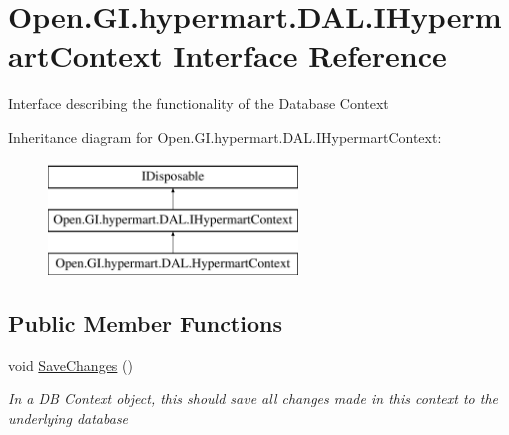 \hypertarget{interface_open_1_1_g_i_1_1hypermart_1_1_d_a_l_1_1_i_hypermart_context}{}\section{Open.\+G\+I.\+hypermart.\+D\+A\+L.\+I\+Hypermart\+Context Interface Reference}
\label{interface_open_1_1_g_i_1_1hypermart_1_1_d_a_l_1_1_i_hypermart_context}


Interface describing the functionality of the Database Context  


Inheritance diagram for Open.\+G\+I.\+hypermart.\+D\+A\+L.\+I\+Hypermart\+Context\+:\begin{figure}[H]
\begin{center}
\leavevmode
\includegraphics[height=3.000000cm]{interface_open_1_1_g_i_1_1hypermart_1_1_d_a_l_1_1_i_hypermart_context}
\end{center}
\end{figure}
\subsection*{Public Member Functions}
\begin{DoxyCompactItemize}
\item 
void \hyperlink{interface_open_1_1_g_i_1_1hypermart_1_1_d_a_l_1_1_i_hypermart_context_aacc5015260d97950f2a10d7673873304}{Save\+Changes} ()
\begin{DoxyCompactList}\small\item\em In a DB Context object, this should save all changes made in this context to the underlying database \end{DoxyCompactList}\end{DoxyCompactItemize}
